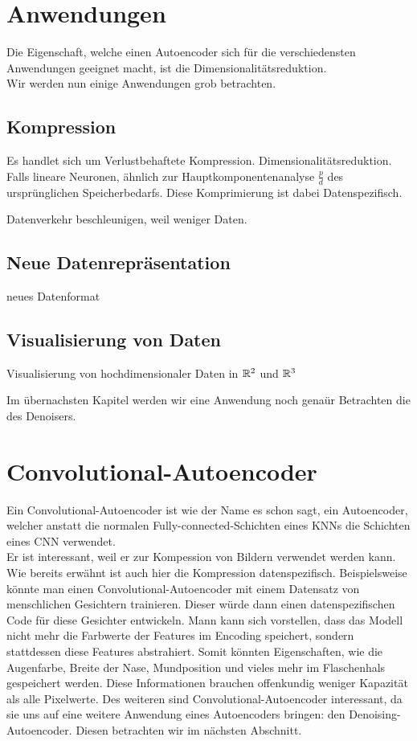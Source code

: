 \section{Anwendungen}
Die Eigenschaft, welche einen Autoencoder sich für die verschiedensten
Anwendungen geeignet macht, ist die Dimensionalitätsreduktion. \\
Wir werden nun einige Anwendungen grob betrachten.

\subsection{Kompression}
Es handlet sich um Verlustbehaftete Kompression.
Dimensionalitätsreduktion. Falls lineare Neuronen, ähnlich zur Hauptkomponentenanalyse
$\frac{p}{d}$ des ursprünglichen Speicherbedarfs. Diese Komprimierung ist dabei Datenspezifisch.

Datenverkehr beschleunigen, weil weniger Daten.

\subsection{Neue Datenrepräsentation}
neues Datenformat

\subsection{Visualisierung von Daten}
Visualisierung von hochdimensionaler Daten in $\mathbb{R}^2$ und $\mathbb{R}^3$


Im übernachsten Kapitel werden wir eine Anwendung noch genaür Betrachten die
des Denoisers.

\section{Convolutional-Autoencoder}
Ein Convolutional-Autoencoder ist wie der Name es schon sagt, ein Autoencoder,
welcher anstatt die normalen Fully-connected-Schichten eines KNNs die Schichten eines CNN verwendet. \\
Er ist interessant, weil er zur Kompession von Bildern verwendet werden kann.
Wie bereits erwähnt ist auch hier die Kompression datenspezifisch.
Beispielsweise könnte man einen Convolutional-Autoencoder mit einem Datensatz
von menschlichen Gesichtern trainieren. Dieser würde dann einen
datenspezifischen Code für diese Gesichter entwickeln. Mann kann sich
vorstellen, dass das Modell nicht mehr die Farbwerte der Features im Encoding
speichert, sondern stattdessen diese Features abstrahiert. Somit könnten
Eigenschaften, wie die Augenfarbe, Breite der Nase, Mundposition und vieles mehr
im Flaschenhals gespeichert werden. Diese Informationen brauchen offenkundig
weniger Kapazität als alle Pixelwerte.
\para{}
Des weiteren sind Convolutional-Autoencoder interessant, da sie uns auf eine
weitere Anwendung eines Autoencoders bringen: den Denoising-Autoencoder.
Diesen betrachten wir im nächsten Abschnitt.


